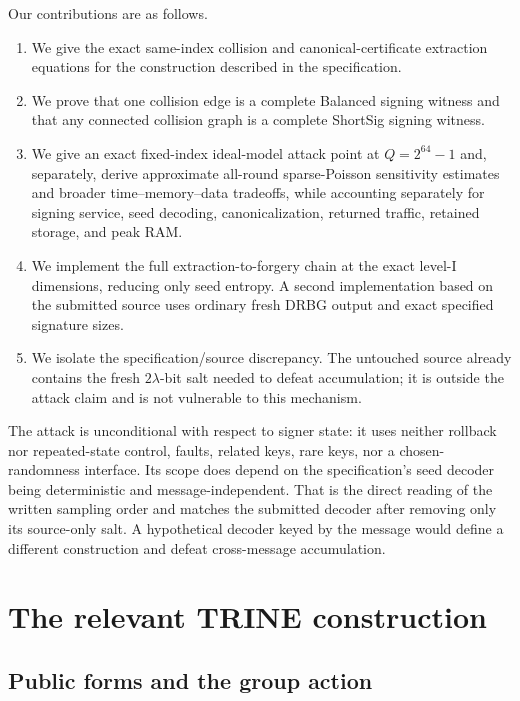 \documentclass[11pt,a4paper]{article}
\begin{document}
Our contributions are as follows.
\begin{enumerate}[leftmargin=*,itemsep=2pt]
  \item We give the exact same-index collision and canonical-certificate
        extraction equations for the construction described in the
        specification.
  \item We prove that one collision edge is a complete Balanced signing
        witness and that any connected collision graph is a complete ShortSig
        signing witness.
  \item We give an exact fixed-index ideal-model attack point at
        $Q=2^{64}-1$ and, separately, derive approximate all-round
        sparse-Poisson sensitivity estimates and broader time--memory--data
        tradeoffs, while accounting separately for signing
        service, seed decoding, canonicalization, returned traffic, retained
        storage, and peak RAM.
  \item We implement the full extraction-to-forgery chain at the exact level-I
        dimensions, reducing only seed entropy.  A second implementation based
        on the submitted source uses ordinary fresh DRBG output and exact
        specified signature sizes.
  \item We isolate the specification/source discrepancy.  The untouched source
        already contains the fresh $2\lambda$-bit salt needed to defeat
        accumulation; it is outside the attack claim and is not vulnerable to
        this mechanism.
\end{enumerate}

The attack is unconditional with respect to signer state: it uses neither
rollback nor repeated-state control, faults, related keys, rare keys, nor a
chosen-randomness interface.  Its scope does depend on the specification's seed
decoder being deterministic and message-independent.  That is the direct
reading of the written sampling order and matches the submitted decoder after
removing only its source-only salt.  A hypothetical decoder keyed by the
message would define a different construction and defeat cross-message
accumulation.

\section{The relevant TRINE construction}

\subsection{Public forms and the group action}
\end{document}
